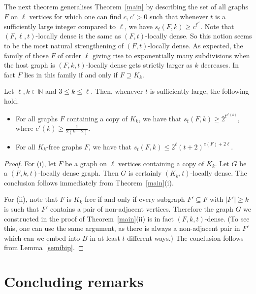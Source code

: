 \documentclass[12pt]{amsart}
\begin{document}
The next theorem generalises Theorem~\ref{main} by describing the set of all graphs $F$ on $\ell$ vertices for which one can find $c,c' > 0$ such that whenever $t$ is a sufficiently large integer compared to $\ell$, we have $s_t(F,k) \geq c^{t^{c'}}$.
Note that $(F,\ell,t)$-locally dense is the same as $(F,t)$-locally dense.
So this notion seems to be the most natural strengthening of $(F,t)$-locally dense.
As expected, the family of those $F$ of order $\ell$ giving rise to exponentially many subdivisions when the host graph is $(F,k,t)$-locally dense gets strictly larger as $k$ decreases.
In fact $F$ lies in this family if and only if $F \supseteq K_k$.



\begin{theorem}\label{general}
Let $\ell,k \in \mathbb{N}$ and $3 \leq k \leq \ell$. Then, whenever $t$ is sufficiently large, the following hold.
\begin{itemize}
\item[(i)] For all graphs $F$ containing a copy of $K_k$, we have that $s_t(F,k) \geq 2^{t^{c'(k)}}$, where $c'(k) \geq \frac{1}{2(k-2)}$.
\item[(ii)] For all $K_k$-free graphs $F$, we have that $s_t(F,k) \leq 2^\ell(t+2)^{e(F)+2\ell}$.
\end{itemize}
\end{theorem}

\begin{proof}
For (i), let $F$ be a graph on $\ell$ vertices containing a copy of $K_k$.
Let $G$ be a $(F,k,t)$-locally dense graph.
Then $G$ is certainly $(K_k,t)$-locally dense.
The conclusion follows immediately from Theorem~\ref{main}(i).

For (ii), note that $F$ is $K_k$-free if and only if every subgraph $F' \subseteq F$ with $|F'| \geq k$ is such that $F'$ contains a pair of non-adjacent vertices.
Therefore the graph $G$ we constructed in the proof of Theorem~\ref{main}(ii) is in fact $(F,k,t)$-dense.
(To see this, one can use the same argument, as there is always a non-adjacent pair in $F'$ which can we embed into $B$ in at least $t$ different ways.) The conclusion follows from Lemma~\ref{semibip}.
\end{proof}



\section{Concluding remarks}\label{sec-conclude}
\end{document}

